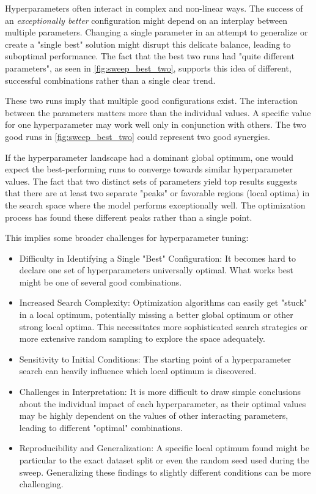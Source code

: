 Hyperparameters often interact in complex and non-linear ways. The success of an \emph{exceptionally better} configuration might depend on an interplay between multiple parameters. Changing a single parameter in an attempt to generalize or create a "single best" solution might disrupt this delicate balance, leading to suboptimal performance. The fact that the best two runs had "quite different parameters", as seen in \autoref{fig:sweep_best_two}, supports this idea of different, successful combinations rather than a single clear trend.

These two runs imply that multiple good configurations exist. The interaction between the parameters matters more than the individual values. A specific value for one hyperparameter may work well only in conjunction with others. The two good runs in \autoref{fig:sweep_best_two} could represent two good synergies. 

If the hyperparameter landscape had a dominant global optimum, one would expect the best-performing runs to converge towards similar hyperparameter values. The fact that two distinct sets of parameters yield top results suggests that there are at least two separate "peaks" or favorable regions (local optima) in the search space where the model performs exceptionally well. The optimization process has found these different peaks rather than a single point.

This implies some broader challenges for hyperparameter tuning:

\begin{itemize}
    \item Difficulty in Identifying a Single "Best" Configuration: It becomes hard to declare one set of hyperparameters universally optimal. What works best might be one of several good combinations.
    \item Increased Search Complexity: Optimization algorithms can easily get "stuck" in a local optimum, potentially missing a better global optimum or other strong local optima. This necessitates more sophisticated search strategies or more extensive random sampling to explore the space adequately.
    \item Sensitivity to Initial Conditions: The starting point of a hyperparameter search can heavily influence which local optimum is discovered.
    \item Challenges in Interpretation: It is more difficult to draw simple conclusions about the individual impact of each hyperparameter, as their optimal values may be highly dependent on the values of other interacting parameters, leading to different "optimal" combinations.
    \item Reproducibility and Generalization: A specific local optimum found might be particular to the exact dataset split or even the random seed used during the sweep. Generalizing these findings to slightly different conditions can be more challenging.
\end{itemize}


